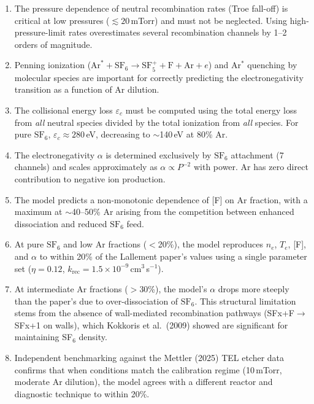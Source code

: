 \documentclass[11pt,a4paper]{article}
\newcommand{\SFsix}{\mathrm{SF}_6}
\newcommand{\SFfive}{\mathrm{SF}_5}
\newcommand{\Ar}{\mathrm{Ar}}
\newcommand{\Te}{T_e}
\newcommand{\ne}{n_e}
\begin{document}
\begin{enumerate}
\item The pressure dependence of neutral recombination rates (Troe fall-off) is critical at low pressures ($\lesssim 20$\,mTorr) and must not be neglected.  Using high-pressure-limit rates overestimates several recombination channels by 1--2 orders of magnitude.

\item Penning ionization ($\Ar^* + \SFsix \to \SFfive^+ + \mathrm{F} + \Ar + e$) and Ar$^*$ quenching by molecular species are important for correctly predicting the electronegativity transition as a function of Ar dilution.

\item The collisional energy loss $\varepsilon_c$ must be computed using the total energy loss from \emph{all} neutral species divided by the total ionization from \emph{all} species.  For pure $\SFsix$, $\varepsilon_c \approx 280$\,eV, decreasing to $\sim$140\,eV at 80\% Ar.

\item The electronegativity $\alpha$ is determined exclusively by $\SFsix$ attachment (7 channels) and scales approximately as $\alpha \propto P^{-2}$ with power.  Ar has zero direct contribution to negative ion production.

\item The model predicts a non-monotonic dependence of [F] on Ar fraction, with a maximum at $\sim$40--50\% Ar arising from the competition between enhanced dissociation and reduced $\SFsix$ feed.

\item At pure $\SFsix$ and low Ar fractions ($<$20\%), the model reproduces $\ne$, $\Te$, [F], and $\alpha$ to within 20\% of the Lallement paper's values using a single parameter set ($\eta = 0.12$, $k_\mathrm{rec} = 1.5 \times 10^{-9}$\,cm$^3$\,s$^{-1}$).

\item At intermediate Ar fractions ($>$30\%), the model's $\alpha$ drops more steeply than the paper's due to over-dissociation of $\SFsix$.  This structural limitation stems from the absence of wall-mediated recombination pathways (SFx+F$\to$SFx+1 on walls), which Kokkoris et al.\ (2009) showed are significant for maintaining SF$_6$ density.

\item Independent benchmarking against the Mettler (2025) TEL etcher data confirms that when conditions match the calibration regime (10\,mTorr, moderate Ar dilution), the model agrees with a different reactor and diagnostic technique to within 20\%.
\end{enumerate}
\end{document}
